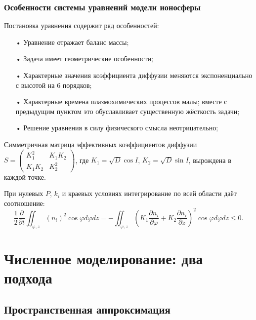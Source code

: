 \documentclass[9pt, apectratio=43,unicode]{beamer}
\begin{document}
\begin{frame}\frametitle{Особенности системы уравнений модели ионосферы}

Постановка уравнения содержит ряд особенностей:
\begin{itemize}
\item[•] Уравнение отражает баланс массы;
\item[•] Задача имеет геометрические особенности;
\item[•] Характерные значения коэффициента диффузии меняются экспоненциально с высотой на $6$ порядков;
\item[•] Характерные времена плазмохимических процессов малы; вместе с предыдущим пунктом это обуславливает существенную жёсткость задачи;
\item[•] Решение уравнения в силу физического смысла неотрицательно;
\end{itemize}

Симметричная матрица эффективных коэффициентов диффузии $S = \begin{pmatrix}K_1^2 & K_1K_2 \\
K_1K_2 & K_2^2 \end{pmatrix}$, где $K_1 = \sqrt{D}\cos I$, $K_2 = \sqrt{D}\sin I$, вырождена в каждой точке. 

При нулевых $P$, $k_i$ и краевых условиях интегрирование по всей области даёт соотношение: 
$$\dfrac{1}{2}\dfrac{\partial}{\partial t} \iint_{\varphi, z} (n_i)^2 \cos\varphi d\varphi dz = - \iint_{\varphi, z}\left(K_1 \dfrac{\partial n_i}{\partial\varphi} + K_2\dfrac{\partial n_i}{\partial z}\right)^2 \cos \varphi d\varphi dz \leq 0.$$

\end{frame}


\section{Численное моделирование: два подхода}

\subsection{Пространственная аппроксимация}
\end{document}
